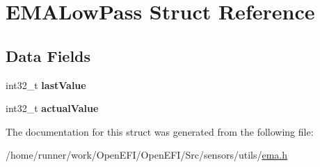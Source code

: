 \hypertarget{structEMALowPass}{}\section{E\+M\+A\+Low\+Pass Struct Reference}
\label{structEMALowPass}
\subsection*{Data Fields}
\begin{DoxyCompactItemize}
\item 
\mbox{\label{structEMALowPass_a0d097234ce8f61b4c23f790816199833}} 
int32\+\_\+t {\bfseries last\+Value}
\item 
\mbox{\label{structEMALowPass_a1b434a1ef92e2eca5ec9b13180168a13}} 
int32\+\_\+t {\bfseries actual\+Value}
\end{DoxyCompactItemize}


The documentation for this struct was generated from the following file\+:\begin{DoxyCompactItemize}
\item 
/home/runner/work/\+Open\+E\+F\+I/\+Open\+E\+F\+I/\+Src/sensors/utils/\hyperlink{ema_8h}{ema.\+h}\end{DoxyCompactItemize}
